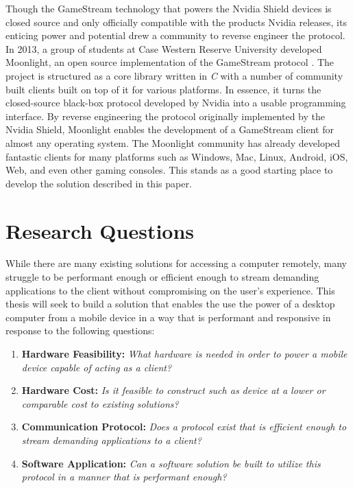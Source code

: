 Though the GameStream technology that powers the Nvidia Shield devices is closed source and only officially compatible with the products Nvidia releases, its enticing power and potential drew a community to reverse engineer the protocol.
In 2013, a group of students at Case Western Reserve University developed Moonlight, an open source implementation of the GameStream protocol \cite{moonlight}.
The project is structured as a core library written in \emph{C} with a number of community built clients built on top of it for various platforms.
In essence, it turns the closed-source black-box protocol developed by Nvidia into a usable programming interface.
By reverse engineering the protocol originally implemented by the Nvidia Shield, Moonlight enables the development of a GameStream client for almost any operating system.
The Moonlight community has already developed fantastic clients for many platforms such as Windows, Mac, Linux, Android, iOS, Web, and even other gaming consoles.
This stands as a good starting place to develop the solution described in this paper.

\section{Research Questions}\label{sec:ResearchQuestions}

While there are many existing solutions for accessing a computer remotely, many struggle to be performant enough or efficient enough to stream demanding applications to the client without compromising on the user's experience.
This thesis will seek to build a solution that enables the use the power of a desktop computer from a mobile device in a way that is performant and responsive in response to the following questions:

\begin{enumerate}
  \item \textbf{Hardware Feasibility:} \emph{What hardware is needed in order to power a mobile device capable of acting as a client?}
  \item \textbf{Hardware Cost:} \emph{Is it feasible to construct such as device at a lower or comparable cost to existing solutions?}
  \item \textbf{Communication Protocol:} \emph{Does a protocol exist that is efficient enough to stream demanding applications to a client?}
  \item \textbf{Software Application:} \emph{Can a software solution be built to utilize this protocol in a manner that is performant enough?}
\end{enumerate}